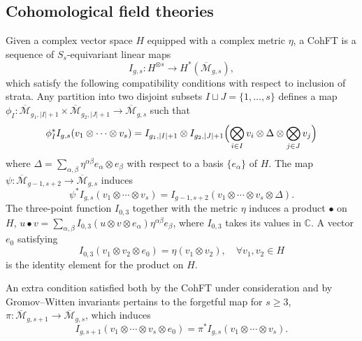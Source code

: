 \documentclass[11pt]{article}
\def\be{\begin{equation}}
\def\ee{\end{equation}}
\newcommand{\modm}{\mathcal{M}}
\theoremstyle{plain}
\theoremstyle{definition}
\newcommand{\bc}{\mathbb{C}}
\begin{document}
\subsection{Cohomological field theories}\label{ss:Frob}

Given a complex vector space $H$ equipped with a complex metric $\eta$, a CohFT is a sequence of $S_s$-equivariant linear maps
$$
I_{g,s}:H^{\otimes s}\to H^*(\overline{\modm}_{g,s}),
$$
which satisfy the following compatibility conditions with respect to inclusion of strata.
Any partition into two disjoint subsets $I\sqcup J=\{1,\dots,s\}$ defines a map
$\phi_I:\overline{\modm}_{g_1,|I|+1}\times\overline{\modm}_{g_2,|J|+1}\to\overline{\modm}_{g,s}$ such that
$$
\phi_I^*I_{g,s}(v_1\otimes\cdots\otimes v_s)=I_{g_1,|I|+1}\otimes I_{g_2,|J|+1}
\Bigl(\bigotimes_{i\in I}v_i\otimes\Delta\otimes\bigotimes_{j\in J}v_j\Bigr)
$$
where $\Delta=\sum_{\alpha,\beta}\eta^{\alpha\beta}e_{\alpha}\otimes e_{\beta}$ with respect to a basis $\{e_{\alpha}\}$ of $H$.  
The map $\psi:\overline{\modm}_{g-1,s+2}\to\overline{\modm}_{g,s}$ induces
$$
\psi^*I_{g,s}(v_1\otimes\cdots\otimes v_s)=I_{g-1,s+2}(v_1\otimes\cdots\otimes v_s\otimes\Delta).
$$
The three-point function $I_{0,3}$ together with the metric $\eta$ induces a product $\bullet$ on $H$,
$u\bullet v=\sum_{\alpha,\beta}I_{0,3}(u\otimes v\otimes e_{\alpha})\eta^{\alpha\beta}e_{\beta}$,
where $I_{0,3}$ takes its values in $\bc$.   A vector $e_0$ satisfying
$$
I_{0,3}(v_1\otimes v_2\otimes e_0)=\eta(v_1\otimes v_2),\quad \forall v_1,v_2\in H
$$
is the identity element for the product on $H$.

An extra condition satisfied both by the CohFT under consideration and by Gromov--Witten invariants
pertains to the forgetful map  for $s\geq 3$, $\pi:\overline{\modm}_{g,s+1}\to\overline{\modm}_{g,s}$, which
induces
\be
I_{g,s+1}(v_1\otimes\cdots\otimes v_s\otimes e_0)=\pi^*I_{g,s}(v_1\otimes\cdots\otimes v_s).
\label{forget}
\ee
\end{document}
